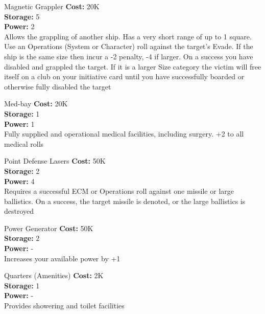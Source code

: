 \begin{multicols}{2}
\begin{genericsection}{Magnetic Grappler}
\textbf{Cost:} 20K\\
\textbf{Storage:} 5\\
\textbf{Power:} 2\\
Allows the grappling of another ship. Has a very short range of up to 1 square. Use an Operations (System or Character) roll against the target's Evade. If the ship is the same size then incur a -2 penalty, -4 if larger. On a success you have disabled and grappled the target. If it is a larger Size category the victim will free itself on a club on your initiative card until you have successfully boarded or otherwise fully disabled the target
\end{genericsection}

\begin{genericsection}{Med-bay}
\textbf{Cost:} 20K\\
\textbf{Storage:} 1\\
\textbf{Power:} 1\\
Fully supplied and operational medical facilities, including surgery. +2 to all medical rolls
\end{genericsection}

\begin{genericsection}{Point Defense Lasers}
\textbf{Cost:} 50K\\
\textbf{Storage:} 2\\
\textbf{Power:} 4\\
Requires a successful ECM or Operations roll against one missile or large ballistics. On a success, the target missile is denoted, or the large ballistics is destroyed
\end{genericsection}

\begin{genericsection}{Power Generator}
\textbf{Cost:} 50K\\
\textbf{Storage:} 2\\
\textbf{Power:} -\\
Increases your available power by +1\\
\end{genericsection}

\begin{genericsection}{Quarters (Amenities)}
\textbf{Cost:} 2K\\
\textbf{Storage:} 1\\
\textbf{Power:} -\\
Provides showering and toilet facilities
\end{genericsection}


\end{multicols}
